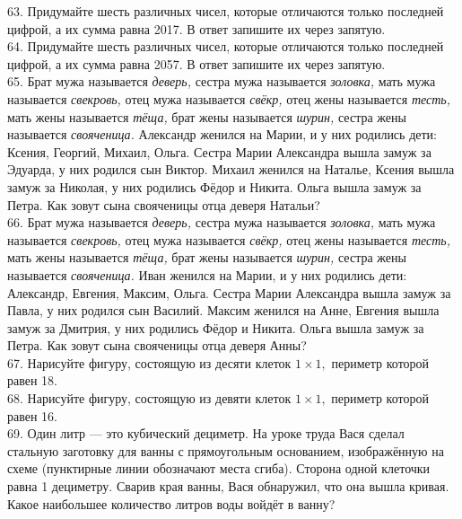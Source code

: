 \documentclass[12pt]{article}
\begin{document}
63. Придумайте шесть различных чисел, которые отличаются только последней цифрой, а их сумма равна 2017. В ответ запишите их через запятую.\\
64. Придумайте шесть различных чисел, которые отличаются только последней цифрой, а их сумма равна 2057. В ответ запишите их через запятую.\\
65. Брат мужа называется {\it деверь,} сестра мужа называется {\it золовка,} мать мужа называется {\it свекровь,} отец мужа называется {\it свёкр,} отец жены называется {\it тесть,} мать жены называется {\it тёща,} брат жены называется {\it шурин,} сестра жены называется {\it свояченица.} Александр женился на Марии, и у них родились дети: Ксения, Георгий, Михаил, Ольга. Сестра Марии Александра вышла замуж за Эдуарда, у них родился сын Виктор. Михаил женился на Наталье, Ксения вышла замуж за Николая, у них родились Фёдор и Никита. Ольга вышла замуж за Петра. Как зовут сына свояченицы отца деверя Натальи?\\
66.  Брат мужа называется {\it деверь,} сестра мужа называется {\it золовка,} мать мужа называется {\it свекровь,} отец мужа называется {\it свёкр,} отец жены называется {\it тесть,} мать жены называется {\it тёща,} брат жены называется {\it шурин,} сестра жены называется {\it свояченица.} Иван женился на Марии, и у них родились дети: Александр, Евгения, Максим, Ольга. Сестра Марии Александра вышла замуж за Павла, у них родился сын Василий. Максим женился на Анне, Евгения вышла замуж за Дмитрия, у них родились Фёдор и Никита. Ольга вышла замуж за Петра. Как зовут сына свояченицы отца деверя Анны?\\
67. Нарисуйте фигуру, состоящую из десяти клеток $1\times1,$ периметр которой равен 18.\\
68. Нарисуйте фигуру, состоящую из девяти клеток $1\times1,$ периметр которой равен 16.\\
69. Один литр --- это кубический дециметр. На уроке труда Вася сделал стальную заготовку для ванны с прямоугольным основанием, изображённую на схеме (пунктирные линии обозначают места сгиба). Сторона одной клеточки равна 1 дециметру. Сварив края ванны, Вася обнаружил, что она вышла кривая. Какое наибольшее количество литров воды войдёт в ванну?
\begin{center}
\begin{figure}[ht!]
\end{figure}
\end{center}
\end{document}
